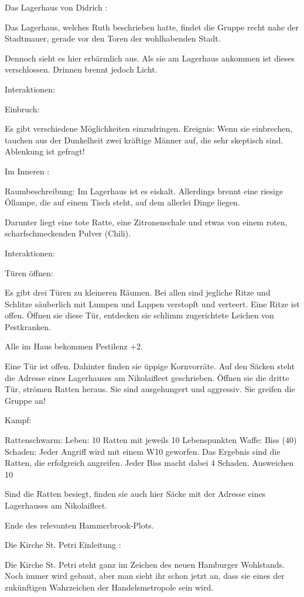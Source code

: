 Das Lagerhaus von Didrich
:

Das Lagerhaus, welches Ruth beschrieben hatte, findet die Gruppe recht nahe der Stadtmauer, gerade vor den Toren der wohlhabenden Stadt.

Dennoch sieht es hier erbärmlich aus. Als sie am Lagerhaus ankommen ist dieses verschlossen. Drinnen brennt jedoch Licht.

Interaktionen:

Einbruch:

Es gibt verschiedene Möglichkeiten einzudringen.
Ereignis: Wenn sie einbrechen, tauchen aus der Dunkelheit zwei kräftige Männer auf, die sehr skeptisch sind. Ablenkung ist gefragt!


Im Inneren
:

Raumbeschreibung: Im Lagerhaus ist es eiskalt. Allerdings brennt eine riesige Öllampe, die auf einem Tisch steht, auf dem allerlei Dinge liegen.

Darunter liegt eine tote Ratte, eine Zitronenschale und etwas von einem roten, scharfschmeckenden Pulver (Chili).

Interaktionen:

Türen öffnen:

Es gibt drei Türen zu kleineren Räumen. Bei allen sind jegliche Ritze und Schlitze säuberlich mit Lumpen und Lappen verstopft und verteert. Eine Ritze ist offen.
Öffnen sie diese Tür, entdecken sie schlimm zugerichtete Leichen von Pestkranken.

Alle im Haus bekommen Pestilenz +2.

Eine Tür ist offen. Dahinter finden sie üppige Kornvorräte. Auf den Säcken steht die Adresse eines Lagerhauses am Nikolaifleet geschrieben.
Öffnen sie die dritte Tür, strömen Ratten heraus. Sie sind ausgehungert und aggressiv. Sie greifen die Gruppe an!

Kampf:

Rattenschwarm:
Leben: 10 Ratten mit jeweils 10 Lebenspunkten
Waffe: Biss (40)
Schaden: Jeder Angriff wird mit einem W10 geworfen. Das Ergebnis sind die Ratten, die erfolgreich angreifen. Jeder Biss macht dabei 4 Schaden.
Ausweichen 10

Sind die Ratten besiegt, finden sie auch hier Säcke mit der Adresse eines Lagerhauses am Nikolaifleet.

Ende des relevanten Hammerbrook-Plots.

Die Kirche St. Petri
Einleitung
:

Die Kirche St. Petri steht ganz im Zeichen des neuen Hamburger Wohlstands. Noch immer wird gebaut, aber man sieht ihr schon jetzt an, dass sie eines der zukünftigen Wahrzeichen der Handelsmetropole sein wird.

